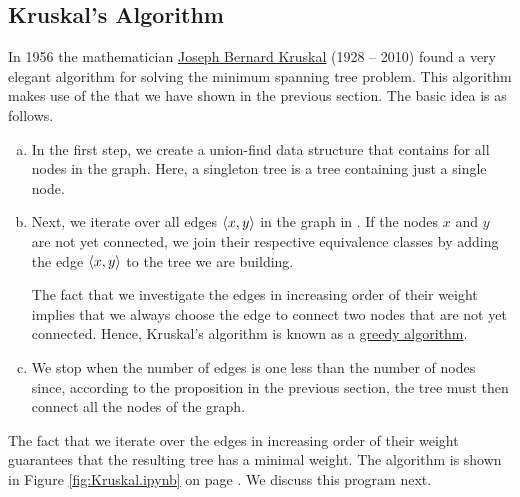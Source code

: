 \subsection{Kruskal's Algorithm}
In 1956 the mathematician \href{https://en.wikipedia.org/wiki/Joseph_Kruskal}{Joseph Bernard Kruskal} (1928 -- 2010) 
found a very elegant algorithm for solving the minimum spanning tree problem.   This algorithm makes use
of the  that we have shown in the previous section.  The basic idea is as
follows.
\begin{enumerate}[(a)]
\item In the first step, we create a union-find data structure that contains 
      for all nodes in the graph.  Here, a singleton tree is a tree containing just a single node.
\item Next, we iterate over all edges $\pair(x, y)$ in the graph in .
      If the nodes $x$ and $y$ are not yet connected, we join their respective equivalence classes by adding
      the edge $\pair(x, y)$ to the tree we are building.

      The fact that we investigate the edges in increasing order of their weight implies that we always choose
      the  edge to connect two nodes that are not yet connected.  Hence, Kruskal's algorithm is
      known as a \href{https://en.wikipedia.org/wiki/Greedy_algorithm}{greedy algorithm}.
\item We stop when the number of edges is one less than the number of nodes since, according to the
      proposition in the previous section, the tree must then connect all the nodes of the graph. 
\end{enumerate}
The fact that we iterate over the edges in increasing order of their weight guarantees that the
resulting tree has a minimal weight.
The algorithm is shown in Figure \ref{fig:Kruskal.ipynb} on page \pageref{fig:Kruskal.ipynb}.  We
discuss this program next.

